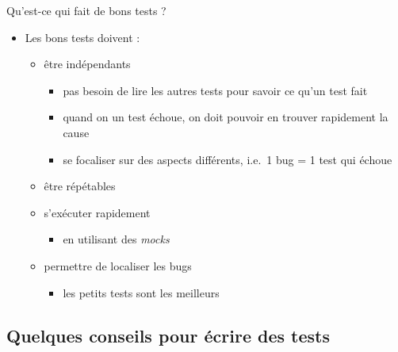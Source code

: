 \begin{frame}{Qu'est-ce qui fait de bons tests ?}

\begin{itemize}
\itemsep1pt\parskip0pt
\item
  Les bons tests doivent :

  \begin{itemize}
  \itemsep1pt\parskip0pt
  \item
    être indépendants

    \begin{itemize}
    \itemsep1pt\parskip0pt
    \item
      pas besoin de lire les autres tests pour savoir ce qu'un test fait
    \item
      quand on un test échoue, on doit pouvoir en trouver rapidement la
      cause
    \item
      se focaliser sur des aspects différents, i.e.~1 bug = 1 test qui
      échoue
    \end{itemize}
  \item
    être répétables
  \item
    s'exécuter rapidement

    \begin{itemize}
    \itemsep1pt\parskip0pt
    \item
      en utilisant des \emph{mocks}
    \end{itemize}
  \item
    permettre de localiser les bugs

    \begin{itemize}
    \itemsep1pt\parskip0pt
    \item
      les petits tests sont les meilleurs
    \end{itemize}
  \end{itemize}
 \end{itemize}
\end{frame}

  \subsection{Quelques conseils pour écrire des
  tests}\label{quelques-conseils-pour-uxe9crire-des-tests}


